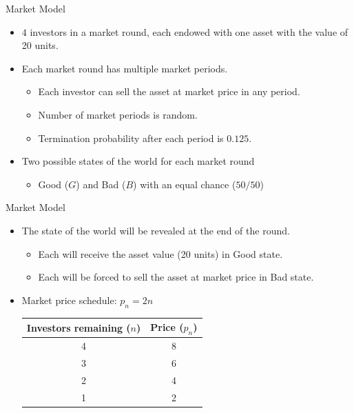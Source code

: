 \documentclass{beamer}
\begin{document}
\begin{frame}{Market Model}
\begin{itemize}
    \item $4$ investors in a market round, each endowed with one asset with the value of 20 units.
    \item Each market round has multiple market periods.  
    \begin{itemize}
    \item Each investor can sell the asset at market price in any period.
    \item Number of market periods is random. 
    \item Termination probability after each period is  $0.125$.
    \end{itemize} 
    
    \item Two possible states of the world for each market round
     \begin{itemize}
    \item Good ($G$) and Bad ($B$) with an equal chance ($50/50$)
    \end{itemize} 
    

\end{itemize}
\end{frame}


\begin{frame}{Market Model}
\begin{itemize}
    \item The state of the world will be revealed at the end of the round. 
     \begin{itemize}
     \item Each will receive the asset value (20 units) in Good state. 
     \item Each will be forced to sell the asset at market price in Bad state.
     \end{itemize}
     
 \item Market price schedule: $p_n = 2n$
    \begin{center}
    \begin{tabular}{cc} 
    \toprule
    \textbf{Investors remaining ($n$)} & \textbf{Price  ($p_n$)} \\
    \midrule
    4 & 8 \\
    3 & 6 \\
    2 & 4 \\
    1 & 2 \\
    \bottomrule
    \end{tabular}
    \end{center}

\end{itemize}
\end{frame}
\end{document}
